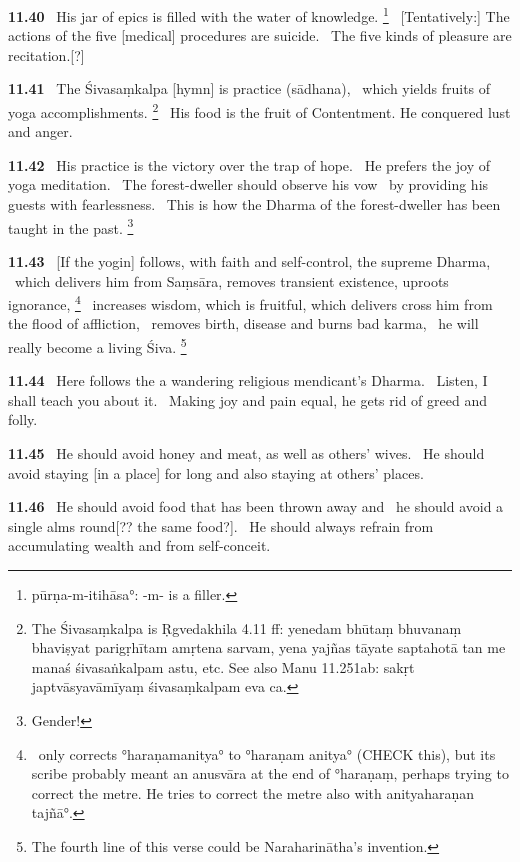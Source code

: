 \documentclass{article}
\begin{document}
\textbf{11.40}%
\ His jar of epics is filled with the water of knowledge.%
\footnote{pūrṇa-m-itihāsa°: -m- is a filler. }%
\ [Tentatively:] The actions of the five [medical] procedures are suicide.%
\                                 The five kinds of pleasure are recitation.[?]%


\textbf{11.41}%
\ The Śivasaṃkalpa [hymn] is practice (sādhana),%
\                      which yields fruits of yoga accomplishments.%
\footnote{The Śivasaṃkalpa is Ṛgvedakhila 4.11 ff:        yenedam bhūtaṃ bhuvanaṃ bhaviṣyat parigṛhītam amṛtena sarvam,        yena yajñas tāyate saptahotā tan me manaś śivasaṅkalpam astu, etc.         See also Manu 11.251ab: sakṛt japtvāsyavāmīyaṃ śivasaṃkalpam eva ca. }%
\ His food is the fruit of Contentment. He conquered lust and anger.%


\textbf{11.42}%
\ His practice is the victory over the trap of hope.%
\              He prefers the joy of yoga meditation.%
\ The forest-dweller should observe his vow%
\              by providing his guests with fearlessness.%
\ This is how the Dharma of the forest-dweller has been taught in the past.%
\footnote{Gender! }%


\textbf{11.43}%
\ [If the yogin] follows, with faith and self-control, the supreme Dharma,%
\              which delivers him from Saṃsāra, removes transient existence, uproots ignorance,%
\footnote{\msNa\ only corrects °haraṇamanitya° to °haraṇam anitya° (CHECK this),                but its scribe probably meant an anusvāra at the end of °haraṇaṃ,                perhaps trying to correct the metre. He tries to correct the metre               also with anityaharaṇan tajñā°. }%
\ increases wisdom, which is fruitful, which delivers cross him from the flood of affliction,%
\ removes birth, disease and burns bad karma,%
\ he will really become a living Śiva.%
\footnote{The fourth line of this verse could be Naraharinātha's invention. }%


\textbf{11.44}%
\ Here follows the a wandering religious mendicant's Dharma.%
\              Listen, I shall teach you about it.%
\ Making joy and pain equal, he gets rid of greed and folly.%


\textbf{11.45}%
\ He should avoid honey and meat, as well as others' wives.%
\ He should avoid staying [in a place] for long and also staying at others' places.%


\textbf{11.46}%
\ He should avoid food that has been thrown away and%
\                  he should avoid a single alms round[?? the same food?].%
\ He should always refrain from accumulating wealth and from self-conceit.%
\end{document}
